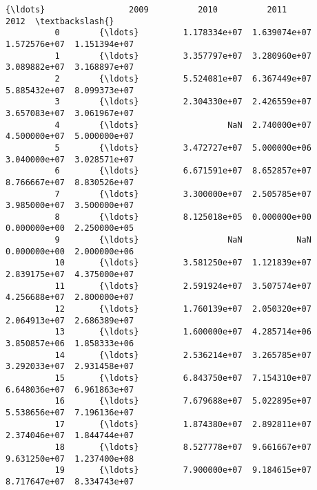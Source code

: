 \documentclass[11pt]{article}
\begin{document}
\begin{Verbatim}[commandchars=\\\{\}]
                   {\ldots}                 2009          2010          2011          2012  \textbackslash{}
          0        {\ldots}         1.178334e+07  1.639074e+07  1.572576e+07  1.151394e+07   
          1        {\ldots}         3.357797e+07  3.280960e+07  3.089882e+07  3.168897e+07   
          2        {\ldots}         5.524081e+07  6.367449e+07  5.885432e+07  8.099373e+07   
          3        {\ldots}         2.304330e+07  2.426559e+07  3.657083e+07  3.061967e+07   
          4        {\ldots}                  NaN  2.740000e+07  4.500000e+07  5.000000e+07   
          5        {\ldots}         3.472727e+07  5.000000e+06  3.040000e+07  3.028571e+07   
          6        {\ldots}         6.671591e+07  8.652857e+07  8.766667e+07  8.830526e+07   
          7        {\ldots}         3.300000e+07  2.505785e+07  3.985000e+07  3.500000e+07   
          8        {\ldots}         8.125018e+05  0.000000e+00  0.000000e+00  2.250000e+05   
          9        {\ldots}                  NaN           NaN  0.000000e+00  2.000000e+06   
          10       {\ldots}         3.581250e+07  1.121839e+07  2.839175e+07  4.375000e+07   
          11       {\ldots}         2.591924e+07  3.507574e+07  4.256688e+07  2.800000e+07   
          12       {\ldots}         1.760139e+07  2.050320e+07  2.064913e+07  2.686389e+07   
          13       {\ldots}         1.600000e+07  4.285714e+06  3.850857e+06  1.858333e+06   
          14       {\ldots}         2.536214e+07  3.265785e+07  3.292033e+07  2.931458e+07   
          15       {\ldots}         6.843750e+07  7.154310e+07  6.648036e+07  6.961863e+07   
          16       {\ldots}         7.679688e+07  5.022895e+07  5.538656e+07  7.196136e+07   
          17       {\ldots}         1.874380e+07  2.892811e+07  2.374046e+07  1.844744e+07   
          18       {\ldots}         8.527778e+07  9.661667e+07  9.631250e+07  1.237400e+08   
          19       {\ldots}         7.900000e+07  9.184615e+07  8.717647e+07  8.334743e+07   
          

\end{Verbatim}
\end{document}
